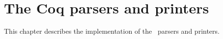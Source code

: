 
\newpage
\section*{The Coq parsers and printers}

\ocwsection \label{parsing}
This chapter describes the implementation of the \Coq\ parsers and printers.

\bigskip
\begin{center}\end{center}
